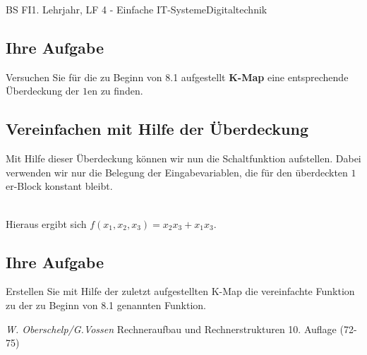 \documentclass[11pt,twocolumn,oneside,openany,headings=optiontotoc,11pt,numbers=noenddot]{article}
\begin{document}
\begin{worksheet}{BS FI}{1. Lehrjahr, LF 4 - Einfache IT-Systeme}{Digitaltechnik}
		\subsection*{Ihre Aufgabe} Versuchen Sie für die zu Beginn von 8.1 aufgestellt \textbf{K-Map} eine entsprechende Überdeckung der \(1\)en zu finden.
		\subsection{Vereinfachen mit Hilfe der Überdeckung}
		Mit Hilfe dieser Überdeckung können wir nun die Schaltfunktion aufstellen. Dabei verwenden wir nur die Belegung der Eingabevariablen, die für den überdeckten \(1\)er-Block konstant bleibt.\\
		\par\noindent
		\begin{karnaugh-map}[4][2][1][$x_2x_1$][$x_3$]
		\end{karnaugh-map}\\
		Hieraus ergibt sich \(f(x_1,x_2,x_3) = x_2x_3 + x_1x_3\).
		\subsection*{Ihre Aufgabe} Erstellen Sie mit Hilfe der zuletzt aufgestellten K-Map die vereinfachte Funktion zu der zu Beginn von 8.1 genannten Funktion.\\
		\par\noindent
		\tiny{\color{codegray}\textit{W. Oberschelp/G.Vossen} Rechneraufbau und Rechnerstrukturen 10. Auflage (72-75)}
	\end{worksheet}
\end{document}
